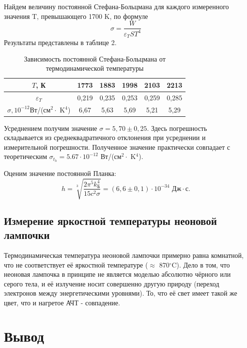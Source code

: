 Найдем величину постоянной Стефана-Больцмана для каждого измеренного значения T, превышающего 1700 K, по формуле
\begin{equation*}
    \sigma = \frac{W}{\varepsilon_T S T^4} 
\end{equation*}
Результаты представлены в таблице 2.

 \begin{table}[h]
    \centering
    \caption{Зависимость постоянной Стефана-Больцмана от термодинамической температуры}
    \label{bolts}
    \begin{tabular}{|c||c|c|c|c|c|}
 \hline
 $T$, К & 1773 & 1883 & 1998 & 2103 & 2213 
 \\
 \hline
$\varepsilon_T$ & 0,219 & 0,235 & 0,253 & 0,259 & 0,285
\\
\hline
  $\sigma, 10^{-12}$Вт/(см$^2 \cdot$ K$^4$) & 6,67 & 5,63 & 5,69 & 5,21 & 5,29
\\
\hline

\end{tabular}
\end{table}   

Усреднением получим значение $\sigma = 5,70 \pm 0,25$. Здесь погрешность складывается из среднеквадратичного отклонения при усреднении и измерительной погрешности. Полученное значение практически совпадает с теоретическим
    $\sigma_{t_h} = 5.67\cdot 10^{-12}$ Вт/(см$^2 \cdot$ K$^4$).

Оценим значение постоянной Планка:
\begin{equation*}
    h = \sqrt[3]{\frac{2 \pi^5 k_\text{Б}^4}{15 c^2 \sigma}} = (6,6 \pm 0,1) \cdot 10^{-34}\text{ Дж}\cdot\text{с}.
\end{equation*}

\subsection{Измерение яркостной температуры неоновой лампочки}
Термодинамическая температура неоновой лампочки примерно равна комнатной, что не соответствует её яркостной температуре ($\approx$ 870$^{\circ}$C). Дело в том, что неоновая лампочка в принципе не является моделью абсолютно чёрного или серого тела, и её излучение носит совершенно другую природу (переход электронов между энергетическими уровнями). То, что её свет имеет такой же цвет, что и нагретое АЧТ - совпадение.


\section{Вывод}

